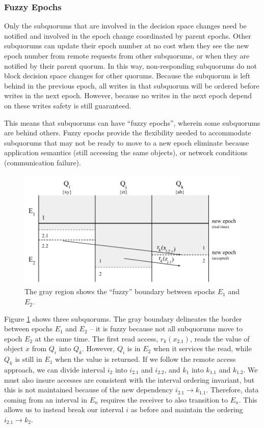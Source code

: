 \documentclass[11pt,letterpaper]{article}
\begin{document}
\subsubsection{Fuzzy Epochs}

Only the subquorums that are involved in the  decision space changes need be notified and
involved in the epoch change coordinated by parent epochs.
Other subquorums can update their epoch number at no cost when they see the new epoch
number from remote requests from other subquorums, or when they are notified by their
parent quorum.
In this way, non-responding subquorums do not block decision space changes for other
quorums.
Because the subquorum is left behind in the previous epoch, all writes in that subquorum
will be ordered before writes in the next epoch.
However, because no writes in the next epoch depend on these writes safety is still
guaranteed.

This means that subquorums can have ``fuzzy epochs'', wherein some subquorums are behind
others.
Fuzzy epochs provide the flexibility needed to accommodate subquorums that may not be
ready to move to a new epoch eliminate because application semantics (still accessing the
same objects), or network conditions (communication failure).

\begin{figure}[t]
    \centering
    \includegraphics[height=0.2\textheight]{figures/fuzzy}
    \caption{The gray region shows the ``fuzzy'' boundary between epochs $E_1$ and $E_2$.}
    \label{fig:fuzzy}
\end{figure}

Figure \ref{fig:fuzzy} shows three subquorums.
The gray boundary delineates the border between epochs $E_1$ and $E_2$ -- it is fuzzy
because not all subquorums move to epoch $E_2$ at the same time.
The first read access, $r_k(x_{2.1})$, reads the value of object $x$ from $Q_i$ into
$Q_k$.
However, $Q_i$ is in $E_2$ when it services the read, while $Q_k$ is still in $E_1$ when
the value is returned.
If we follow the remote access approach, we can divide interval $i_2$ into $i_{2.1}$ and
$i_{2.2}$, and $k_1$ into $k_{1.1}$ and $k_{1.2}$.
We must also insure accesses are consistent with the interval ordering invariant, but
this is not maintained because of the new dependency $i_{2.1} \rightarrow k_{1.1}$.
Therefore, data coming from an interval in $E_n$ requires the receiver to also transition
to $E_n$. This allows us to instead break our interval $i$ as before and maintain the
ordering $i_{2.1} \rightarrow k_2$.
\end{document}
